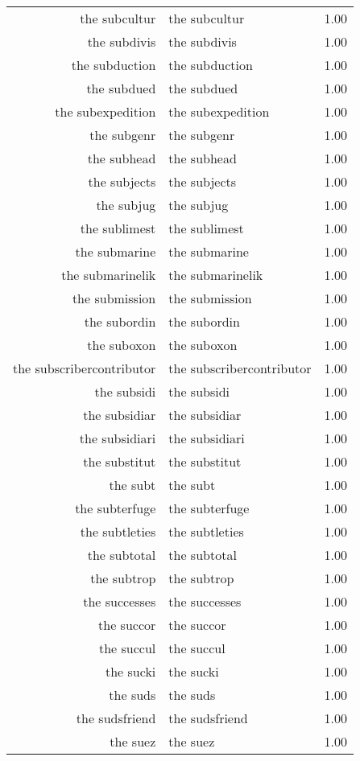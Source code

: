\begin{table}[ht]
\begin{tabular}{rlr}
  the subcultur & the subcultur & 1.00 \\ 
  the subdivis & the subdivis & 1.00 \\ 
  the subduction & the subduction & 1.00 \\ 
  the subdued & the subdued & 1.00 \\ 
  the subexpedition & the subexpedition & 1.00 \\ 
  the subgenr & the subgenr & 1.00 \\ 
  the subhead & the subhead & 1.00 \\ 
  the subjects & the subjects & 1.00 \\ 
  the subjug & the subjug & 1.00 \\ 
  the sublimest & the sublimest & 1.00 \\ 
  the submarine & the submarine & 1.00 \\ 
  the submarinelik & the submarinelik & 1.00 \\ 
  the submission & the submission & 1.00 \\ 
  the subordin & the subordin & 1.00 \\ 
  the suboxon & the suboxon & 1.00 \\ 
  the subscribercontributor & the subscribercontributor & 1.00 \\ 
  the subsidi & the subsidi & 1.00 \\ 
  the subsidiar & the subsidiar & 1.00 \\ 
  the subsidiari & the subsidiari & 1.00 \\ 
  the substitut & the substitut & 1.00 \\ 
  the subt & the subt & 1.00 \\ 
  the subterfuge & the subterfuge & 1.00 \\ 
  the subtleties & the subtleties & 1.00 \\ 
  the subtotal & the subtotal & 1.00 \\ 
  the subtrop & the subtrop & 1.00 \\ 
  the successes & the successes & 1.00 \\ 
  the succor & the succor & 1.00 \\ 
  the succul & the succul & 1.00 \\ 
  the sucki & the sucki & 1.00 \\ 
  the suds & the suds & 1.00 \\ 
  the sudsfriend & the sudsfriend & 1.00 \\ 
  the suez & the suez & 1.00 \\ 

\end{tabular}
\end{table}
